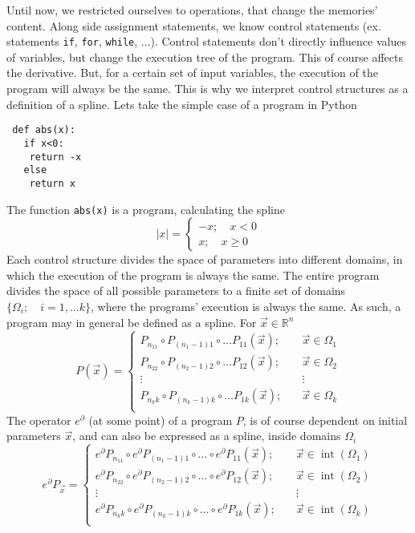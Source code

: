 \documentclass{article}
\newcommand{\RR}{\mathbb{R}}
\newcommand{\D}{\partial}
\DeclareMathOperator{\interior}{int}
\begin{document}
 Until now, we restricted ourselves to operations, that change the memories' content. Along side assignment statements, we know control statements (ex. statements \texttt{if},
  \texttt{for}, \texttt{while}, ...). Control statements don't directly influence values of variables, but change the execution tree of the program. This of course affects the derivative. But, for a certain set of input variables, the execution of the program will always be the same. This is why we interpret control structures as a definition of a spline. Lets take the simple case of a program in Python
 \begin{verbatim}
 def abs(x):
   if x<0:
    return -x
   else
    return x
 \end{verbatim}
 The function \texttt{abs(x)} is a program, calculating the spline
 \begin{equation}
   \label{eq:zlepek}
   |x| =
   \begin{cases}
     -x;\quad x<0\\
     x;\quad x\ge 0
   \end{cases}
 \end{equation}
 Each control structure divides the space of parameters into different domains, in which the execution of the program is always the same. The entire program divides the space of all possible parameters to a finite set of domains $\{\Omega_i;\quad i=1,\ldots
  k\}$, where the programs' execution is always the same. As such, a program may in general be defined as a spline. For $\vec{x}\in\RR^n$
 \begin{equation}
   \label{eq:zlrprk_splosno}
   P(\vec{x}) =
   \begin{cases}
     P_{n_11}\circ P_{(n_1-1)1}\circ\ldots P_{11}(\vec{x});&\quad \vec{x}\in\Omega_1\\
     P_{n_22}\circ P_{(n_2-1)2}\circ\ldots P_{12}(\vec{x});&\quad \vec{x}\in\Omega_2\\
     \vdots&\quad\vdots\\
     P_{n_kk}\circ P_{(n_k-1)k}\circ\ldots P_{1k}(\vec{x});&\quad \vec{x}\in\Omega_k\\
   \end{cases}
 \end{equation}
 The operator $e^\D$ (at some point) of a program $P$, is of course dependent on initial parameters $\vec{x}$, and can also be expressed as a spline, inside domains $\Omega_i$
 \begin{equation}
   \label{eq:Dzlrprk_splosno}
   e^\D P_{\vec{x}} =
   \begin{cases}
     e^\D P_{n_11}\circ e^\D P_{(n_1-1)1}\circ\ldots\circ e^\D P_{11}(\vec{x});&\quad \vec{x}\in\interior(\Omega_1)\\
     e^\D P_{n_22}\circ e^\D P_{(n_2-1)2}\circ\ldots\circ e^\D P_{12}(\vec{x});&\quad \vec{x}\in\interior(\Omega_2)\\
     \vdots&\quad\vdots\\
     e^\D P_{n_kk}\circ e^\D P_{(n_k-1)k}\circ\ldots\circ e^\D P_{1k}(\vec{x});&\quad \vec{x}\in\interior(\Omega_k)\\
   \end{cases}
 \end{equation}
\end{document}
